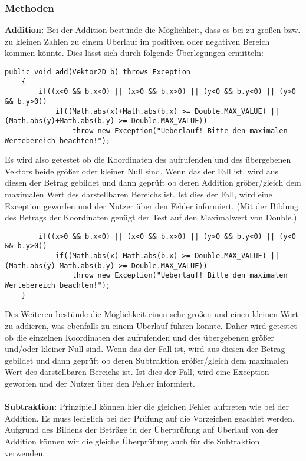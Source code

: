\documentclass[a4paper,11pt]{scrartcl}
\begin{document}
\subsubsection{Methoden}
\textbf{Addition:}  Bei der Addition bestünde die Möglichkeit, dass es bei zu großen bzw. zu kleinen Zahlen zu einem Überlauf im positiven oder negativen Bereich kommen könnte. Dies lässt sich durch folgende Überlegungen ermitteln:
\begin{lstlisting}
public void add(Vektor2D b) throws Exception
	{
		if((x<0 && b.x<0) || (x>0 && b.x>0) || (y<0 && b.y<0) || (y>0 && b.y>0)) 
			if((Math.abs(x)+Math.abs(b.x) >= Double.MAX_VALUE) || (Math.abs(y)+Math.abs(b.y) >= Double.MAX_VALUE))
				throw new Exception("Ueberlauf! Bitte den maximalen Wertebereich beachten!");
\end{lstlisting}
Es wird also getestet ob die Koordinaten des aufrufenden und des übergebenen Vektors beide größer oder kleiner Null sind. Wenn das der Fall ist, wird aus diesen der Betrag gebildet und dann geprüft ob deren Addition größer/gleich dem maximalen Wert des darstellbaren Bereichs ist. Ist dies der Fall, wird eine Exception geworfen und der Nutzer über den Fehler informiert.
(Mit der Bildung des Betrags der Koordinaten genügt der Test auf den Maximalwert von Double.)
\begin{lstlisting}		
		if((x>0 && b.x<0) || (x<0 && b.x>0) || (y>0 && b.y<0) || (y<0 && b.y>0))
			if((Math.abs(x)-Math.abs(b.x) >= Double.MAX_VALUE) || (Math.abs(y)-Math.abs(b.y) >= Double.MAX_VALUE))
				throw new Exception("Ueberlauf! Bitte den maximalen Wertebereich beachten!");
	}
\end{lstlisting}
Des Weiteren bestünde die Möglichkeit einen sehr großen und einen kleinen Wert zu addieren, was ebenfalls zu einem Überlauf führen könnte. Daher wird getestet ob die einzelnen Koordinaten des aufrufenden und des übergebenen größer und/oder kleiner Null sind. Wenn das der Fall ist, wird aus diesen der Betrag gebildet und dann geprüft ob deren Subtraktion größer/gleich dem maximalen Wert des darstellbaren Bereichs ist. Ist dies der Fall, wird eine Exception geworfen und der Nutzer über den Fehler informiert.\\
\\
\textbf{Subtraktion:} Prinzipiell können hier die gleichen Fehler auftreten wie bei der Addition. Es muss lediglich bei der Prüfung auf die Vorzeichen geachtet werden. Aufgrund des Bildens der Beträge in der Überprüfung auf Überlauf von der Addition können wir die gleiche Überprüfung auch für die Subtraktion verwenden.\\
\end{document}
